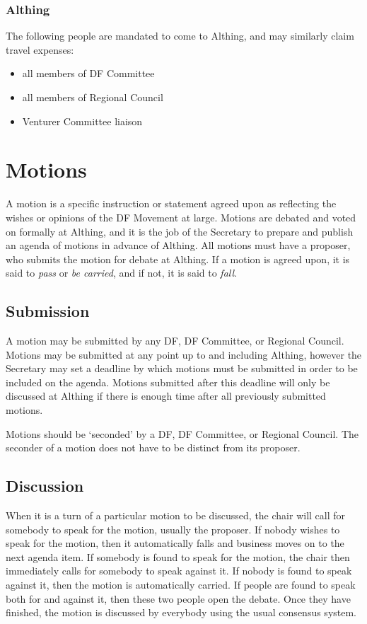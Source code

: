 \documentclass[a4paper, 12pt]{article} %
\begin{document}
\subsubsection{Althing}
The following people are mandated to come to Althing, and may similarly claim travel expenses:
\begin{itemize}
\item all members of DF Committee
\item all members of Regional Council
\item Venturer Committee liaison
\end{itemize}

\section{Motions}
A motion is a specific instruction or statement agreed upon as reflecting the wishes or opinions of the DF Movement at large.  Motions are debated and voted on formally at Althing, and it is the job of the Secretary to prepare and publish an agenda of motions in advance of Althing.  All motions must have a proposer, who submits the motion for debate at Althing. If a motion is agreed upon, it is said to \emph{pass} or \emph{be carried}, and if not, it is said to \emph{fall}.

\subsection{Submission}
A motion may be submitted by any DF, DF Committee, or Regional Council.  Motions may be submitted at any point up to and including Althing, however the Secretary may set a deadline by which motions must be submitted in order to be included on the agenda.  Motions submitted after this deadline will only be discussed at Althing if there is enough time after all previously submitted motions.

Motions should be `seconded' by a DF, DF Committee, or Regional Council.  The seconder of a motion does not have to be distinct from its proposer.

\subsection{Discussion}
When it is a turn of a particular motion to be discussed, the chair will call for somebody to speak for the motion, usually the proposer.  If nobody wishes to speak for the motion, then it automatically falls and business moves on to the next agenda item.  If somebody is found to speak for the motion, the chair then immediately calls for somebody to speak against it.  If nobody is found to speak against it, then the motion is automatically carried.  If people are found to speak both for and against it, then these two people open the debate.  Once they have finished, the motion is discussed by everybody using the usual consensus system.
\end{document}
